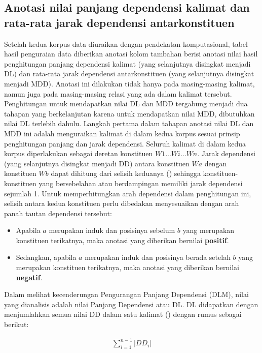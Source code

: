 \subsection{Anotasi nilai panjang dependensi kalimat dan rata-rata jarak dependensi antarkonstituen}
Setelah kedua korpus data diuraikan dengan pendekatan komputasional, tabel hasil penguraian data diberikan anotasi kolom tambahan berisi anotasi nilai hasil penghitungan panjang dependensi kalimat (yang selanjutnya disingkat menjadi DL) dan rata-rata jarak dependensi antarkonstituen (yang selanjutnya disingkat menjadi MDD). Anotasi ini dilakukan tidak hanya pada masing-masing kalimat, namun juga pada masing-masing relasi yang ada dalam kalimat tersebut. Penghitungan untuk mendapatkan nilai DL dan MDD tergabung menjadi dua tahapan yang berkelanjutan karena untuk mendapatkan nilai MDD, dibutuhkan nilai DL terlebih dahulu. Langkah pertama dalam tahapan anotasi nilai DL dan MDD ini adalah menguraikan kalimat di dalam kedua korpus sesuai prinsip penghitungan panjang dan jarak dependensi. Seluruh kalimat di dalam kedua korpus diperlakukan sebagai deretan konstituen $W1...Wi...Wn$. Jarak dependensi (yang selanjutnya disingkat menjadi DD) antara konstituen $Wa$ dengan konstituen $Wb$ dapat dihitung dari selisih keduanya (\citealp{liu2008dependency, liu2017dependency, futrell2015large}) sehingga konstituen-konstituen yang bersebelahan atau berdampingan memiliki jarak dependensi sejumlah 1. Untuk memperhitungkan arah dependensi dalam penghitungan ini, selisih antara kedua konstituen perlu dibedakan menyesuaikan dengan arah panah tautan dependensi tersebut:
\begin{itemize}
\item Apabila $a$ merupakan induk dan posisinya sebelum $b$ yang merupakan konstituen terikatnya, maka anotasi yang diberikan bernilai \textbf{positif}.
\item Sedangkan, apabila $a$ merupakan induk dan posisinya berada setelah $b$ yang merupakan konstituen terikatnya, maka anotasi yang diberikan bernilai \textbf{negatif}. 
\end{itemize}
Dalam melihat kecenderungan Pengurangan Panjang Dependensi (DLM), nilai yang dianalisis adalah nilai Panjang Dependensi atau DL. DL didapatkan dengan menjumlahkan semua nilai DD dalam satu kalimat (\citealp{gildea2010grammars, futrell2015large}) dengan rumus sebagai berikut: 

\noindent \begin{align}\label{eq:bola}
	\displaystyle\sum_{i=1}^{n-1} |DD_i|
\end{align}

